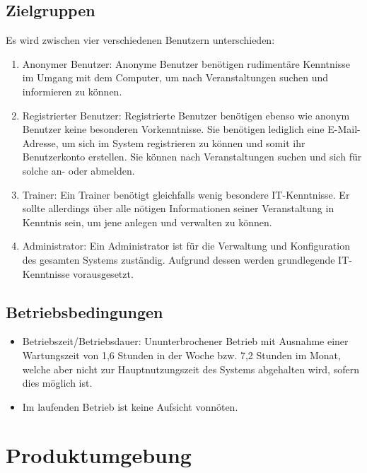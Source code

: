 \documentclass[a4paper]{scrreprt}
\begin{document}
	\section{Zielgruppen}
		 Es wird zwischen vier verschiedenen Benutzern unterschieden:
		 \begin{enumerate}
		 	\item Anonymer Benutzer: Anonyme Benutzer benötigen rudimentäre Kenntnisse im Umgang mit dem Computer, um nach Veranstaltungen suchen und informieren zu können.
		 	\item Registrierter Benutzer: Registrierte Benutzer benötigen ebenso wie anonym Benutzer keine besonderen Vorkenntnisse. Sie benötigen lediglich eine E-Mail-Adresse, um sich im System registrieren zu können und somit ihr Benutzerkonto erstellen. Sie können nach Veranstaltungen suchen und sich für solche an- oder abmelden.
		 	\item Trainer: Ein Trainer benötigt gleichfalls wenig besondere IT-Kenntnisse. Er sollte allerdings über alle nötigen Informationen seiner Veranstaltung in Kenntnis sein, um jene anlegen und verwalten zu können.
		 	\item Administrator: Ein Administrator ist für die Verwaltung und Konfiguration des gesamten Systems zuständig. Aufgrund dessen werden grundlegende IT-Kenntnisse vorausgesetzt.	
		 \end{enumerate}  
        
    
	\section{Betriebsbedingungen}
	       \begin{itemize}
	       	\item Betriebszeit/Betriebsdauer: Ununterbrochener Betrieb mit Ausnahme einer Wartungszeit von 1,6 Stunden in der Woche bzw. 7,2 Stunden im Monat, welche aber nicht zur Hauptnutzungszeit des Systems abgehalten wird, sofern dies möglich ist.
	       	\item  Im laufenden Betrieb ist keine Aufsicht vonnöten.
	       \end{itemize}
	
			
 
\chapter{Produktumgebung}
\end{document}
